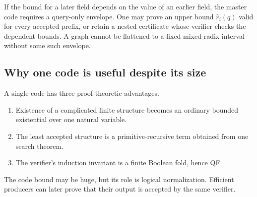 \begin{warning}
If the bound for a later field depends on the value of an earlier field, the
master code requires a query-only envelope.  One may prove an upper bound
\(\widehat r_i(q)\) valid for every accepted prefix, or retain a nested
certificate whose verifier checks the dependent bounds.  A graph cannot be
flattened to a fixed mixed-radix interval without some such envelope.
\end{warning}

\subsection{Why one code is useful despite its size}

A single code has three proof-theoretic advantages.

\begin{enumerate}
\item Existence of a complicated finite structure becomes an ordinary bounded
existential over one natural variable.
\item The least accepted structure is a primitive-recursive term obtained from
one search theorem.
\item The verifier's induction invariant is a finite Boolean fold, hence QF.
\end{enumerate}

The code bound may be huge, but its role is logical normalization.  Efficient
producers can later prove that their output is accepted by the same verifier.
